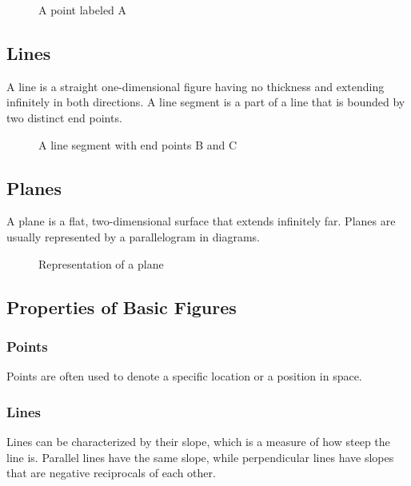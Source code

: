\documentclass[a4paper,12pt]{book}
\begin{document}
\begin{figure}[H]
\centering
{}
\caption{A point labeled A}
\end{figure}

\subsection{Lines}
A line is a straight one-dimensional figure having no thickness and extending infinitely in both directions. A line segment is a part of a line that is bounded by two distinct end points.

\begin{figure}[H]
\centering
{}
\caption{A line segment with end points B and C}
\end{figure}

\subsection{Planes}
A plane is a flat, two-dimensional surface that extends infinitely far. Planes are usually represented by a parallelogram in diagrams.

\begin{figure}[H]
\centering
{}
\caption{Representation of a plane}
\end{figure}

\subsection{Properties of Basic Figures}
\subsubsection{Points}
Points are often used to denote a specific location or a position in space.

\subsubsection{Lines}
Lines can be characterized by their slope, which is a measure of how steep the line is. Parallel lines have the same slope, while perpendicular lines have slopes that are negative reciprocals of each other.
\end{document}
